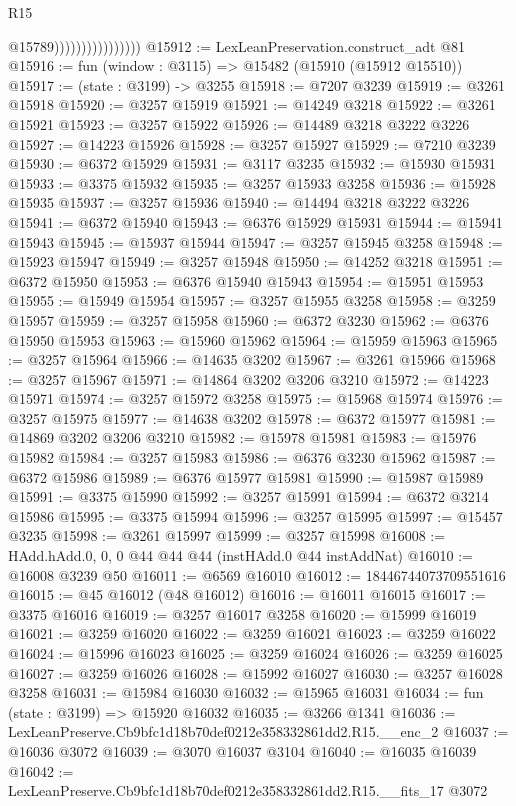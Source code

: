 \begin{lexlean}{R15}
\begin{coremodule}
                                    @15789))))))))))))))))
@15912 := LexLeanPreservation.construct_adt @81
@15916 := fun (window : @3115) => @15482 (@15910 (@15912 @15510))
@15917 := (state : @3199) -> @3255
@15918 := @7207 @3239
@15919 := @3261 @15918
@15920 := @3257 @15919
@15921 := @14249 @3218
@15922 := @3261 @15921
@15923 := @3257 @15922
@15926 := @14489 @3218 @3222 @3226
@15927 := @14223 @15926
@15928 := @3257 @15927
@15929 := @7210 @3239
@15930 := @6372 @15929
@15931 := @3117 @3235
@15932 := @15930 @15931
@15933 := @3375 @15932
@15935 := @3257 @15933 @3258
@15936 := @15928 @15935
@15937 := @3257 @15936
@15940 := @14494 @3218 @3222 @3226
@15941 := @6372 @15940
@15943 := @6376 @15929 @15931
@15944 := @15941 @15943
@15945 := @15937 @15944
@15947 := @3257 @15945 @3258
@15948 := @15923 @15947
@15949 := @3257 @15948
@15950 := @14252 @3218
@15951 := @6372 @15950
@15953 := @6376 @15940 @15943
@15954 := @15951 @15953
@15955 := @15949 @15954
@15957 := @3257 @15955 @3258
@15958 := @3259 @15957
@15959 := @3257 @15958
@15960 := @6372 @3230
@15962 := @6376 @15950 @15953
@15963 := @15960 @15962
@15964 := @15959 @15963
@15965 := @3257 @15964
@15966 := @14635 @3202
@15967 := @3261 @15966
@15968 := @3257 @15967
@15971 := @14864 @3202 @3206 @3210
@15972 := @14223 @15971
@15974 := @3257 @15972 @3258
@15975 := @15968 @15974
@15976 := @3257 @15975
@15977 := @14638 @3202
@15978 := @6372 @15977
@15981 := @14869 @3202 @3206 @3210
@15982 := @15978 @15981
@15983 := @15976 @15982
@15984 := @3257 @15983
@15986 := @6376 @3230 @15962
@15987 := @6372 @15986
@15989 := @6376 @15977 @15981
@15990 := @15987 @15989
@15991 := @3375 @15990
@15992 := @3257 @15991
@15994 := @6372 @3214 @15986
@15995 := @3375 @15994
@15996 := @3257 @15995
@15997 := @15457 @3235
@15998 := @3261 @15997
@15999 := @3257 @15998
@16008 := HAdd.hAdd.{0, 0, 0} @44 @44 @44 (instHAdd.{0} @44 instAddNat)
@16010 := @16008 @3239 @50
@16011 := @6569 @16010
@16012 := 18446744073709551616
@16015 := @45 @16012 (@48 @16012)
@16016 := @16011 @16015
@16017 := @3375 @16016
@16019 := @3257 @16017 @3258
@16020 := @15999 @16019
@16021 := @3259 @16020
@16022 := @3259 @16021
@16023 := @3259 @16022
@16024 := @15996 @16023
@16025 := @3259 @16024
@16026 := @3259 @16025
@16027 := @3259 @16026
@16028 := @15992 @16027
@16030 := @3257 @16028 @3258
@16031 := @15984 @16030
@16032 := @15965 @16031
@16034 := fun (state : @3199) => @15920 @16032
@16035 := @3266 @1341
@16036 := LexLeanPreserve.Cb9bfc1d18b70def0212e358332861dd2.R15.__enc_2
@16037 := @16036 @3072
@16039 := @3070 @16037 @3104
@16040 := @16035 @16039
@16042 := LexLeanPreserve.Cb9bfc1d18b70def0212e358332861dd2.R15.__fits_17 @3072

\end{coremodule}
\end{lexlean}
